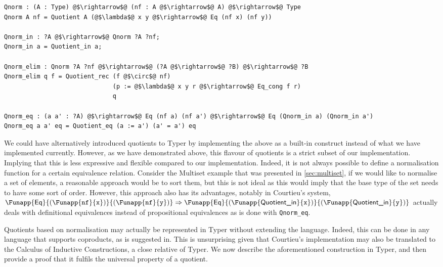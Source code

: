 \documentclass[12pt,twoside,maitrise]{dms}
\theoremstyle{definition}
\numberwithin{equation}{section}
\numberwithin{table}{chapter}
\numberwithin{figure}{chapter}
\newcommand\kw[1] {\textsf{#1}}
\newcommand\id[1] {\texttt{#1}}
\newcommand\fn[1] {\texttt{#1}}
\begin{document}
\begin{verbatim}
Qnorm : (A : Type) @$\rightarrow$@ (nf : A @$\rightarrow$@ A) @$\rightarrow$@ Type
Qnorm A nf = Quotient A (@$\lambda$@ x y @$\rightarrow$@ Eq (nf x) (nf y))

Qnorm_in : ?A @$\rightarrow$@ Qnorm ?A ?nf;
Qnorm_in a = Quotient_in a;

Qnorm_elim : Qnorm ?A ?nf @$\rightarrow$@ (?A @$\rightarrow$@ ?B) @$\rightarrow$@ ?B
Qnorm_elim q f = Quotient_rec (f @$\circ$@ nf)
                              (p := @$\lambda$@ x y r @$\rightarrow$@ Eq_cong f r)
                              q

Qnorm_eq : (a a' : ?A) @$\rightarrow$@ Eq (nf a) (nf a') @$\rightarrow$@ Eq (Qnorm_in a) (Qnorm_in a')
Qnorm_eq a a' eq = Quotient_eq (a := a') (a' = a') eq
\end{verbatim}

We could have alternatively introduced quotients to Typer by implementing the
above as a built-in construct instead of what we have implemented currently.
However, as we have demonstrated above, this flavour of quotients is a strict
subset of our implementation. Implying that this is less expressive and flexible
compared to our implementation. Indeed, it is not always possible to define a
normalisation function for a certain equivalence relation. Consider the Multiset
example that was presented in \autoref{sec:multiset}, if we would like to
normalise a set of elements, a reasonable approach would be to sort them, but
this is not ideal as this would imply that the base type of the set needs to
have some sort of order. However, this approach also has its advantages, notably
in Courtieu's system\cite{courtieu-normalizedtypes},
$\Funapp{\kw{Eq}}{(\Funapp{\id{nf}}{\id{x}})}{(\Funapp{\id{nf}}{\id{y}})}
\Rightarrow
\Funapp{\kw{Eq}}{(\Funapp{\kw{Quotient\_in}}{\id{x}})}{(\Funapp{\kw{Quotient\_in}}{\id{y}})}$
actually deals with definitional equivalences instead of propositional
equivalences as is done with \fn{Qnorm\_eq}.

Quotients based on normalisation may actually be represented in Typer without
extending the language. Indeed, this can be done in any language that supports
coproducts, as is suggested in\cite{HoTTbook}. This is unsurprising given that
Courtieu's implementation may also be translated to the Calculus of Inductive
Constructions\cite{werner-cic}, a close relative of Typer. We now describe the
aforementioned construction in Typer, and then provide a proof that it fulfils
the universal property of a quotient.
\end{document}

